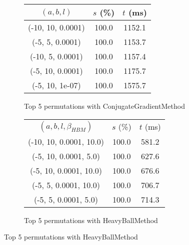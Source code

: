 \begin{figure}[H]
{\begin{subfigure}[ht]{.6\textwidth}
\begin{tabular}{|c|c|c|}
\hline
\rowcolor{gray!25}
$(a,b,l)$ & $s$ (\%) & $t$ (ms) \\
\hline
(-10, 10, 0.0001) & 100.0 & 1152.1 \\
(-5, 5, 0.0001) & 100.0 & 1153.7 \\
(-10, 5, 0.0001) & 100.0 & 1157.4 \\
(-5, 10, 0.0001) & 100.0 & 1175.7 \\
(-5, 10, 1e-07) & 100.0 & 1575.7 \\
\hline
\end{tabular}
\caption{Top 5 permutations with ConjugateGradientMethod}
\label{subfig:param_comp_MatrixSquareSum_ConjugateGradientMethod_BisectionSearch}
\end{subfigure}
\hfill
\begin{subfigure}[ht]{.6\textwidth}
\centering
{}
\begin{tabular}{|c|c|c|}
\hline
\rowcolor{gray!25}
\multicolumn{3}{|c|}{HeavyBallMethod} \\
\hline
\rowcolor{gray!25}
$(a,b,l,\beta_{HBM})$ & $s$ (\%) & $t$ (ms) \\
\hline
(-10, 10, 0.0001, 10.0) & 100.0 & 581.2 \\
(-5, 10, 0.0001, 5.0) & 100.0 & 627.6 \\
(-5, 10, 0.0001, 10.0) & 100.0 & 676.6 \\
(-5, 5, 0.0001, 10.0) & 100.0 & 706.7 \\
(-5, 5, 0.0001, 5.0) & 100.0 & 714.3 \\
\hline
\end{tabular}
\caption{Top 5 permutations with HeavyBallMethod}
\label{subfig:param_comp_MatrixSquareSum_HeavyBallMethod_BisectionSearch}
\end{subfigure}
}
\end{figure}


